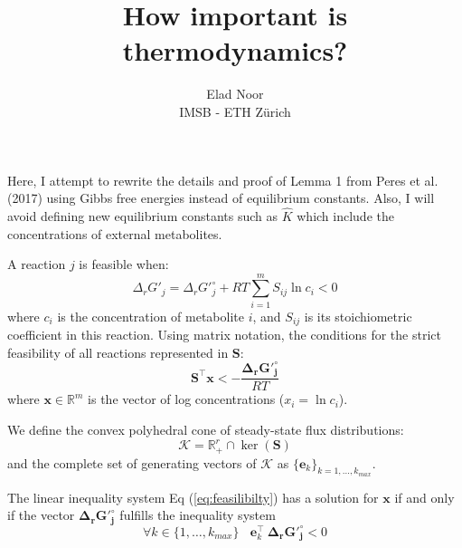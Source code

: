 \documentclass[12pt]{article}
\newenvironment{lemma}[2][Lemma]{\begin{trivlist}
\item[\hskip \labelsep {\bfseries #1}\hskip \labelsep {\bfseries #2.}]}{\end{trivlist}}
\begin{document}
 
 
 
\title{How important is thermodynamics?}%
\author{Elad Noor\\ %
IMSB - ETH Z\"{u}rich} %
 
\maketitle

Here, I attempt to rewrite the details and proof of Lemma 1 from Peres et al. (2017) using Gibbs free energies instead of equilibrium constants. Also, I will avoid defining new equilibrium constants such as $\hat{K}$ which include the concentrations of external metabolites.

A reaction $j$ is feasible when:
\begin{equation}
    \Delta_r G'_j = \Delta_r G'^\circ_j + RT \sum_{i=1}^{m} S_{ij} \ln{c_i} < 0
\end{equation}
where $c_i$ is the concentration of metabolite $i$, and $S_{ij}$ is its stoichiometric coefficient in this reaction. Using matrix notation, the conditions for the strict feasibility of all reactions represented in $\mathbf{S}$:
\begin{equation}\label{eq:feasilibilty}
    \mathbf{S}^\top \mathbf{x} < -\frac{\mathbf{\Delta_r G'^\circ_j}}{RT}
\end{equation}
where $\mathbf{x} \in \mathbb{R}^m$ is the vector of log concentrations ($x_i = \ln{c_i}$).

We define the convex polyhedral cone of steady-state flux distributions:
\begin{equation}
    \mathcal{K} = \mathbb{R}_+^r \cap \ker(\mathbf{S})
\end{equation}
and the complete set of generating vectors of $\mathcal{K}$ as $\{\mathbf{e}_k\}_{k = 1, \ldots, k_{max}}$.

\begin{lemma}{1}
The linear inequality system Eq (\ref{eq:feasilibilty}) has a solution for $\mathbf{x}$ if and only if the vector $\mathbf{\Delta_r G'^\circ_j}$ fulfills the inequality system
\begin{equation}
    \forall k \in \{1,\ldots,k_{max}\}~~~~\mathbf{e}_k^\top ~\mathbf{\Delta_r G'^\circ_j} < 0
\end{equation}
\end{lemma}
 
\end{document}
